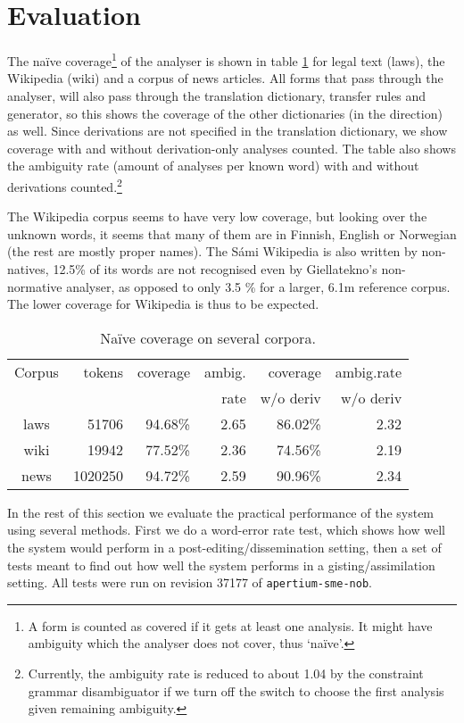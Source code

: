 \documentclass{book}
\begin{document}
\section{Evaluation}
\label{sec:eval}
The na\"{i}ve coverage\footnote{A form is counted as covered if it
  gets at least one analysis. It might have ambiguity which the
  analyser does not cover, thus `na\"{i}ve'.} of the analyser is shown
in table \ref{table:cov} for legal text (laws), the \sme{} Wikipedia
(wiki) and a corpus of \sme{} news articles. All forms that pass
through the analyser, will also pass through the translation
dictionary, transfer rules and generator, so this shows the coverage
of the other dictionaries (in the \smenob{} direction) as well. Since
derivations are not specified in the translation dictionary, we show
coverage with and without derivation-only analyses counted. The table
also shows the ambiguity rate (amount of analyses per known word) with
and without derivations counted.\footnote{Currently, the ambiguity
  rate is reduced to about 1.04 by the constraint grammar
  disambiguator if we turn off the switch to choose the first analysis
  given remaining ambiguity.}


The Wikipedia corpus seems to have very low coverage, but looking over
the unknown words, it seems that many of them are in Finnish, English
or Norwegian (the rest are mostly proper names). The S\'{a}mi Wikipedia
is also written by non-natives, 12.5\% of its words are not recognised
even by Giellatekno's non-normative analyser, as opposed to only 3.5 \% for
a larger, 6.1m reference corpus. The lower coverage for Wikipedia is thus to
be expected.


\begin{table}
  \begin{center}
  \begin{tabular}{crrrrr}
   Corpus     & tokens   & coverage & ambig.      & coverage   & ambig.rate  \\
              &          &          & rate        & w/o deriv  & w/o deriv \\
   laws       &  51706   & 94.68\%  & 2.65        & 86.02\%    & 2.32 \\
   wiki       & 19942    & 77.52\%  & 2.36        & 74.56\%    & 2.19 \\
   news       & 1020250  & 94.72\%  & 2.59        & 90.96\%    & 2.34 \\
  \end{tabular}
    \caption{Na\"{i}ve coverage on several corpora.}
    \label{table:cov}
  \end{center}
\end{table}
In the rest of this section we evaluate the practical performance of
the system using several methods. First we do a word-error rate test,
which shows how well the system would perform in a
post-editing/dissemination setting, then a set of tests meant to find
out how well the system performs in a gisting/assimilation setting.
All tests were run on revision 37177 of \texttt{apertium-sme-nob}.
\end{document}
